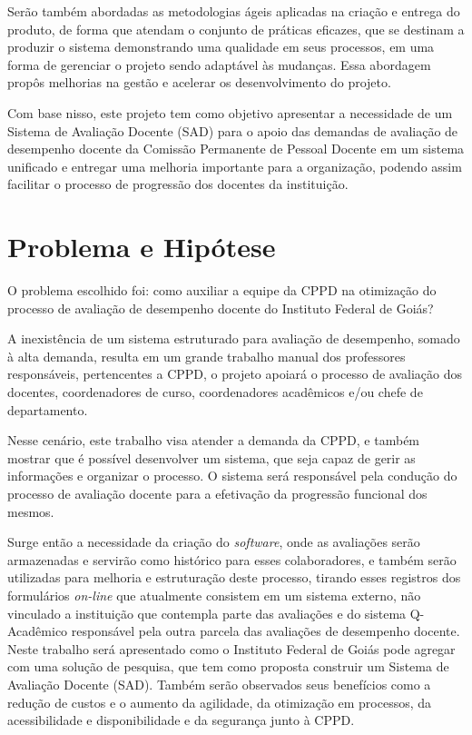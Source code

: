     Serão também abordadas as metodologias ágeis aplicadas na criação e entrega do produto, de forma que atendam o conjunto de práticas eficazes, que se destinam a produzir o sistema demonstrando uma qualidade em seus processos, em uma forma de gerenciar o projeto sendo adaptável às mudanças. Essa abordagem propôs melhorias na gestão e acelerar os desenvolvimento do projeto.

    Com base nisso, este projeto tem como objetivo apresentar a necessidade de um Sistema de Avaliação Docente (SAD) para o apoio das demandas de avaliação de desempenho docente da Comissão Permanente de Pessoal Docente em um sistema unificado e entregar uma melhoria importante para a organização, podendo assim facilitar o processo de progressão dos docentes da instituição.


\section{Problema e Hipótese}

    O problema escolhido foi: como auxiliar a equipe da CPPD na otimização do processo de avaliação de desempenho docente do Instituto Federal de Goiás?
    
    A inexistência de um sistema estruturado para avaliação de desempenho, somado à alta demanda, resulta em um grande trabalho manual dos professores responsáveis, pertencentes a CPPD, o projeto apoiará o processo de avaliação dos docentes, coordenadores de curso, coordenadores acadêmicos e/ou chefe de departamento.
    
    Nesse cenário, este trabalho visa atender a demanda da CPPD, e também mostrar que é possível desenvolver um sistema, que seja capaz de gerir as informações e organizar o processo. O sistema será responsável pela condução do processo de avaliação docente para a efetivação da progressão funcional dos mesmos.
    
    Surge então a necessidade da criação do \textit{software}, onde as avaliações serão armazenadas e servirão como histórico para esses colaboradores, e também serão utilizadas para melhoria e estruturação deste processo, tirando esses registros dos formulários \textit{on-line} que atualmente consistem em um sistema externo, não vinculado a instituição que contempla parte das avaliações e do sistema Q-Acadêmico responsável pela outra parcela das avaliações de desempenho docente. Neste trabalho será apresentado como o Instituto Federal de Goiás pode agregar com uma solução de pesquisa, que tem como proposta construir um Sistema de Avaliação Docente (SAD). Também serão observados seus benefícios como a redução de custos e o aumento da agilidade, da otimização em processos, da acessibilidade e disponibilidade e da segurança junto à CPPD.
    



